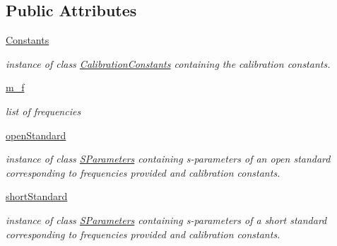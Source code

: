 \subsection*{Public Attributes}
\begin{DoxyCompactItemize}
\item 
\mbox{\label{classSignalIntegrity_1_1Measurement_1_1CalKit_1_1CalibrationKit_1_1CalibrationKit_a198b8c2c77ea9f9815a181ddeda1c320}} 
\hyperlink{classSignalIntegrity_1_1Measurement_1_1CalKit_1_1CalibrationKit_1_1CalibrationKit_a198b8c2c77ea9f9815a181ddeda1c320}{Constants}
\begin{DoxyCompactList}\small\item\em instance of class \hyperlink{classSignalIntegrity_1_1Measurement_1_1CalKit_1_1CalibrationKit_1_1CalibrationConstants}{Calibration\+Constants} containing the calibration constants. \end{DoxyCompactList}\item 
\mbox{\label{classSignalIntegrity_1_1Measurement_1_1CalKit_1_1CalibrationKit_1_1CalibrationKit_a40a26fb5046a51e40dd1b61c78d72ace}} 
\hyperlink{classSignalIntegrity_1_1Measurement_1_1CalKit_1_1CalibrationKit_1_1CalibrationKit_a40a26fb5046a51e40dd1b61c78d72ace}{m\+\_\+f}
\begin{DoxyCompactList}\small\item\em list of frequencies \end{DoxyCompactList}\item 
\hyperlink{classSignalIntegrity_1_1Measurement_1_1CalKit_1_1CalibrationKit_1_1CalibrationKit_adfa88578140d393e4fc3d5e6976c4586}{open\+Standard}
\begin{DoxyCompactList}\small\item\em instance of class \hyperlink{namespaceSignalIntegrity_1_1SParameters}{S\+Parameters} containing s-\/parameters of an open standard corresponding to frequencies provided and calibration constants. \end{DoxyCompactList}\item 
\hyperlink{classSignalIntegrity_1_1Measurement_1_1CalKit_1_1CalibrationKit_1_1CalibrationKit_a094c01f8f3b9b22b8759481b3d5bdb85}{short\+Standard}
\begin{DoxyCompactList}\small\item\em instance of class \hyperlink{namespaceSignalIntegrity_1_1SParameters}{S\+Parameters} containing s-\/parameters of a short standard corresponding to frequencies provided and calibration constants. \end{DoxyCompactList}\item 

\end{DoxyCompactItemize}
